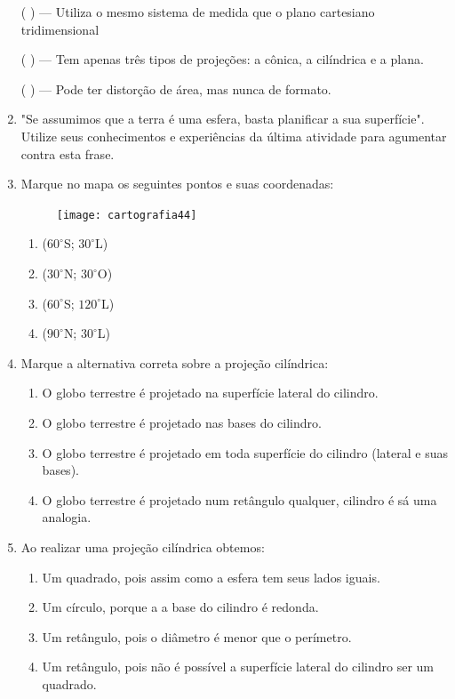 \begin{enumerate}
({ }{ }{ }) --- Utiliza o mesmo sistema de medida que o plano cartesiano tridimensional

({ }{ }{ }) --- Tem apenas três tipos de projeções: a cônica, a cilíndrica e a plana.

({ }{ }{ }) --- Pode ter distorção de área, mas nunca de formato.

\item "Se assumimos que a terra é uma esfera, basta planificar a sua superfície". Utilize seus conhecimentos e experiências da última atividade para agumentar contra esta frase.

\item Marque no mapa os seguintes pontos e suas coordenadas:

\begin{figure}[H]
\centering
\texttt{[image: cartografia44]}

\end{figure}

\begin{enumerate}
\item ($60^{\circ}$S; $30^{\circ}$L)
\item ($30^{\circ}$N; $30^{\circ}$O)
\item ($60^{\circ}$S; $120^{\circ}$L)
\item ($90^{\circ}$N; $30^{\circ}$L)
\end{enumerate}

\item Marque a alternativa correta sobre a projeção cilíndrica:
\begin{enumerate}
\item O globo terrestre é projetado na superfície lateral do cilindro.
\item O globo terrestre é projetado nas bases do cilindro.
\item O globo terrestre é projetado em toda superfície do cilindro (lateral e suas bases).
\item O globo terrestre é projetado num retângulo qualquer, cilindro é sá uma analogia.
\end{enumerate}

\item Ao realizar uma projeção cilíndrica obtemos:
\begin{enumerate}
\item Um quadrado, pois assim como a esfera tem seus lados iguais.
\item Um círculo, porque a a base do cilindro é redonda.
\item Um retângulo, pois o diâmetro é menor que o perímetro.
\item Um retângulo, pois não é possível a superfície lateral do cilindro ser um quadrado.
\end{enumerate}


\end{enumerate}
